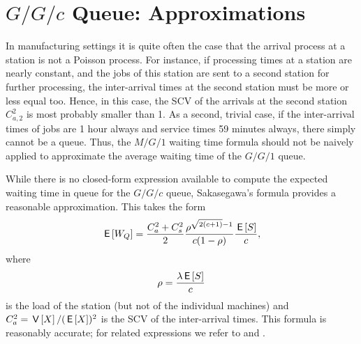 \section{$G/G/c$ Queue: Approximations}
\label{sec:gg1}






In manufacturing settings it is quite often the case that the arrival process at a station is not a Poisson process.
For instance, if processing times at a station are nearly constant, and the jobs of this station are sent to a second station for further processing, the inter-arrival times at the second station must be more or less equal too.
Hence, in this case, the SCV of the arrivals at the second station $C_{a,2}^2$ is most probably smaller than 1.
As a second, trivial case, if the inter-arrival times of jobs are 1 hour always and service times 59 minutes always, there simply cannot be a queue.
Thus, the $M/G/1$ waiting time formula should not be naively applied to approximate the average waiting time of the $G/G/1$ queue.

While there is no closed-form expression available to compute the expected waiting time in queue for the $G/G/c$ queue, Sakasegawa's formula provides a reasonable approximation. This takes the form
\begin{equation}\label{eq:7}
  \,\mathsf{E}\left[W_Q\right] = \frac{C_a^2+C_s^2}2 \frac{\rho^{\sqrt{2(c+1)}-1}}{c(1-\rho)} \frac{\,\mathsf{E}\left[S\right]}c,
\end{equation}
where
\begin{equation*}
  \rho = \frac{\lambda \,\mathsf{E}\left[S\right]}{c}
\end{equation*}
is the load of the station (but not of the individual machines) and $C_a^2 = \,\mathsf{V}\left[X\right]/(\,\mathsf{E}\left[X\right])^2$ is the SCV of the inter-arrival times.
This formula is reasonably accurate; for related expressions we refer to \citet{bolch06:_queuein_networ_markov_chain} and \citet{hall91:_queuein_method_servic_manuf}.


